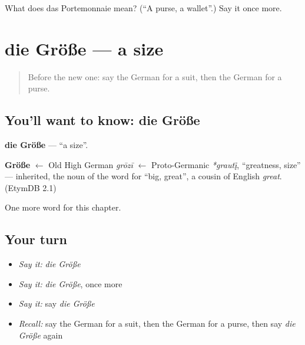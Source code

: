 \begin{tcolorbox}[breakable,colback=teal!4,colframe=teal!35!black,title={Before you move on}]
What does das Portemonnaie mean? (\textquotedblleft{}A purse, a wallet\textquotedblright{}.) Say it once more.
\end{tcolorbox}
\section[die Größe]{die Größe — a size}

\label{lesson:GE-C203-groesse}



\begin{quote}
Before the new one: say the German for a suit, then the German for a purse.
\end{quote}

\subsection*{You'll want to know: die Größe}
\textbf{die Größe} — \textquotedblleft{}a size\textquotedblright{}.

\begin{cousinweb}
\textbf{Größe} $\leftarrow$ Old High German \emph{grōzī} $\leftarrow$ Proto-Germanic \emph{*grautį̄}, \textquotedblleft{}greatness, size\textquotedblright{} — inherited, the noun of the word for \textquotedblleft{}big, great\textquotedblright{}, a cousin of English \emph{great}. (EtymDB 2.1)
\end{cousinweb}

\begin{grammarlens}[title={What you've built}]
One more word for this chapter.
\end{grammarlens}

\subsection*{Your turn}
\begin{itemize}
\raggedright
  \item \emph{Say it:} \emph{die Größe}
  \item \emph{Say it:} \emph{die Größe}, once more
  \item \emph{Say it:} say \emph{die Größe}
  \item \emph{Recall:} say the German for a suit, then the German for a purse, then say \emph{die Größe} again
\end{itemize}

